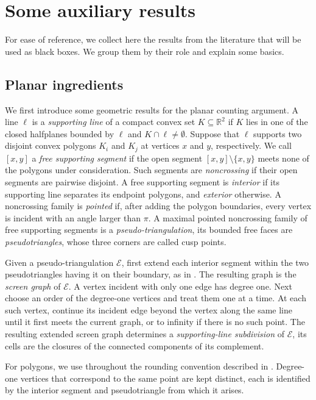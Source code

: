 \documentclass[11pt]{article}
\theoremstyle{definition}
\newcommand{\R}{\mathbb{R}}
\begin{document}
\section{Some auxiliary results}\label{sec:auxiliary}

For ease of reference, we collect here the results from the literature that will be used as black boxes. We group them by their role and explain some basics.

\subsection{Planar ingredients}

We first introduce some geometric results for the planar counting argument. A line \(\ell\) is a \emph{supporting line} of a compact convex set \(K\subseteq\R^{2}\) if \(K\) lies in one of the closed halfplanes bounded by \(\ell\) and \(K\cap\ell\ne\emptyset\). Suppose that \(\ell\) supports two disjoint convex polygons \(K_{i}\) and \(K_{j}\) at vertices \(x\) and \(y\), respectively. We call \([x,y]\) a \emph{free supporting segment} if the open segment \([x,y]\setminus\{x,y\}\) meets none of the polygons under consideration. Such segments are \emph{noncrossing} if their open segments are pairwise disjoint. A free supporting segment is \emph{interior} if its supporting line separates its endpoint polygons, and \emph{exterior} otherwise. A noncrossing family is \emph{pointed} if, after adding the polygon boundaries, every vertex is incident with an angle larger than \(\pi\). A maximal pointed noncrossing family of free supporting segments is a \emph{pseudo-triangulation}, its bounded free faces are \emph{pseudotriangles}, whose three corners are called cusp points.

Given a pseudo-triangulation \(\mathcal{E}\), first extend each interior segment within the two pseudotriangles having it on their boundary, as in \cite[Section~3]{PocchiolaVegter1999}. The resulting graph is the \emph{screen graph} of \(\mathcal{E}\). A vertex incident with only one edge has degree one. Next choose an order of the degree-one vertices and treat them one at a time. At each such vertex, continue its incident edge beyond the vertex along the same line until it first meets the current graph, or to infinity if there is no such point. The resulting extended screen graph determines a \emph{supporting-line subdivision} of \(\mathcal{E}\), its cells are the closures of the connected components of its complement.

For polygons, we use throughout the rounding convention described in \cite[Section~9.2]{RoteSantosStreinu2008}. Degree-one vertices that correspond to the same point are kept distinct, each is identified by the interior segment and pseudotriangle from which it arises.
\end{document}
